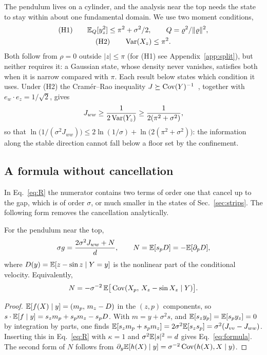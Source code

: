 The pendulum lives on a cylinder, and the analysis near the top needs the state to stay within about one fundamental domain. We use two moment conditions,
\begin{gather}
\text{(H1)} \qquad \mathbb{E}_Q[y_z^2] \leq \pi^2 + \sigma^2/2, \qquad Q = \varrho^2/\|\varrho\|^2, \nonumber\\
\text{(H2)} \qquad \operatorname{Var}(X_z) \leq \pi^2 .
\label{eq:H0}
\end{gather}
Both follow from $\rho = 0$ outside $|z| \leq \pi$ (for (H1) see Appendix~\ref{app:split}), but neither requires it: a Gaussian state, whose density never vanishes, satisfies both when it is narrow compared with $\pi$. Each result below states which condition it uses. Under (H2) the Cram\'er--Rao inequality $J \succeq \operatorname{Cov}(Y)^{-1}$~\cite{cover2006}, together with $e_w\cdot e_z = 1/\sqrt2$, gives
\begin{equation}
J_{ww} \geq \frac{1}{2\operatorname{Var}(Y_z)} \geq \frac{1}{2(\pi^2 + \sigma^2)},
\label{eq:CR}
\end{equation}
so that $\ln\big(1/(\sigma^2 J_{ww})\big) \leq 2\ln(1/\sigma) + \ln\big(2(\pi^2 + \sigma^2)\big)$: the information along the stable direction cannot fall below a floor set by the confinement.

\subsection{A formula without cancellation}

In Eq.~\eqref{eq:R} the numerator contains two terms of order one that cancel up to the gap, which is of order $\sigma$, or much smaller in the states of Sec.~\ref{sec:strips}. The following form removes the cancellation analytically.

\begin{proposition}
\label{prop:formula}
For the pendulum near the top,
\begin{equation}
\sigma g = \frac{2\sigma^2 J_{ww} + N}{d}, \qquad N = \mathbb{E}[s_p D] = -\mathbb{E}[\partial_p D],
\label{eq:formula}
\end{equation}
where $D(y) = \mathbb{E}[z - \sin z \mid Y = y]$ is the nonlinear part of the conditional velocity. Equivalently,
\begin{equation}
N = -\sigma^{-2}\,\mathbb{E}\big[\operatorname{Cov}(X_p,\, X_z - \sin X_z \mid Y)\big].
\label{eq:Ncov}
\end{equation}
\end{proposition}

\begin{proof}
$\mathbb{E}[f(X)\mid y] = (m_p,\, m_z - D)$ in the $(z,p)$ components, so $s\cdot\mathbb{E}[f\mid y] = s_z m_p + s_p m_z - s_p D$. With $m = y + \sigma^2 s$, and $\mathbb{E}[s_z y_p] = \mathbb{E}[s_p y_z] = 0$ by integration by parts, one finds $\mathbb{E}[s_z m_p + s_p m_z] = 2\sigma^2\mathbb{E}[s_z s_p] = \sigma^2(J_{vv} - J_{ww})$. Inserting this in Eq.~\eqref{eq:R} with $\kappa = 1$ and $\sigma^2\mathbb{E}|s|^2 = d$ gives Eq.~\eqref{eq:formula}. The second form of $N$ follows from $\partial_y \mathbb{E}[h(X)\mid y] = \sigma^{-2}\operatorname{Cov}(h(X), X \mid y)$.
\end{proof}


